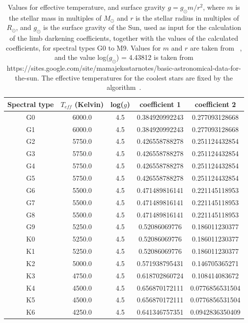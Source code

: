 \documentclass[11pt]{article}      %
\begin{document}
\begin{table}[hbtp]
  \begin{center}
  \caption{Values for effective temperature, and surface gravity $g=g_{\odot}m/r^2$, where $m$ is the stellar mass in multiples of $M_{\odot}$ and $r$ is the stellar radius in multiples of $R_{\odot}$, and $g_{\odot}$ is the surface gravity of the Sun, used as input for the calculation of the limb darkening coefficients, together with the values of the calculated coefficients, for spectral types G0 to M9. Values for $m$ and $r$ are taken from ~\cite{stellarParameters}, and the value log($g_{\odot}$) = 4.43812 is taken from https://sites.google.com/site/mamajeksstarnotes/basic-astronomical-data-for-the-sun. The effective temperatures for the coolest stars are fixed by the algorithm~\cite{limbDarkening_code}.}
  \begin{tabular}{| c | c | c | c | c |}
    \hline 
    Spectral type & $T_{eff}$ (Kelvin) & log($g$) & coefficient 1 & coefficient 2\\
    \hline
G0 & 6000.0 & 4.5 & 0.384920992243 & 0.277093128668 \\
G1 & 6000.0 & 4.5 & 0.384920992243 & 0.277093128668 \\
G2 & 5750.0 & 4.5 & 0.426558788278 & 0.251124432854 \\
G3 & 5750.0 & 4.5 & 0.426558788278 & 0.251124432854 \\
G4 & 5750.0 & 4.5 & 0.426558788278 & 0.251124432854 \\
G5 & 5750.0 & 4.5 & 0.426558788278 & 0.251124432854 \\
G6 & 5500.0 & 4.5 & 0.471489816141 & 0.221145118953 \\
G7 & 5500.0 & 4.5 & 0.471489816141 & 0.221145118953 \\
G8 & 5500.0 & 4.5 & 0.471489816141 & 0.221145118953 \\
G9 & 5250.0 & 4.5 & 0.52086069776 & 0.186011230377 \\
K0 & 5250.0 & 4.5 & 0.52086069776 & 0.186011230377 \\
K1 & 5250.0 & 4.5 & 0.52086069776 & 0.186011230377 \\
K2 & 5000.0 & 4.5 & 0.571938795431 & 0.146705365271 \\
K3 & 4750.0 & 4.5 & 0.618702860724 & 0.108414083672 \\
K4 & 4500.0 & 4.5 & 0.656870172111 & 0.0776856531504 \\
K5 & 4500.0 & 4.5 & 0.656870172111 & 0.0776856531504 \\
K6 & 4250.0 & 4.5 & 0.641346757351 & 0.0942836350409 \\

\end{tabular}
\end{center}
\end{table}
\end{document}
